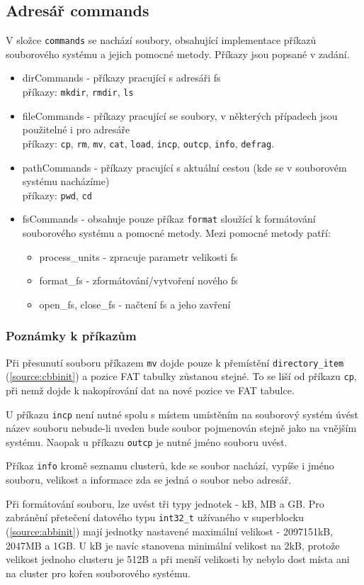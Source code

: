 \documentclass[12pt]{report}
\begin{document}
	\subsection*{Adresář commands}
	\par V složce \texttt{commands} se nachází soubory, obsahující implementace příkazů souborového systému a jejich pomocné metody. Příkazy jsou popsané v zadání.
	\begin{itemize}
		\item dirCommands - příkazy pracující s adresáři fs\\
		příkazy: \texttt{mkdir}, \texttt{rmdir}, \texttt{ls}
		\item fileCommands - příkazy pracující se soubory, v některých případech jsou použitelné i pro adresáře\\
		příkazy: \texttt{cp}, \texttt{rm}, \texttt{mv}, \texttt{cat}, \texttt{load}, \texttt{incp}, \texttt{outcp},
		\texttt{info}, \texttt{defrag}.
		\item pathCommands - příkazy pracující s aktuální cestou (kde se v souborovém systému nacházíme)\\
		příkazy: \texttt{pwd}, \texttt{cd}
		\item fsCommands - obsahuje pouze příkaz \texttt{format} sloužící k formátování souborového systému a pomocné metody. Mezi pomocné metody patří:
		\begin{itemize}
			\item process\_units - zpracuje parametr velikosti fs
			\item format\_fs - zformátování/vytvoření nového fs
			\item open\_fs, close\_fs - načtení fs a jeho zavření
		\end{itemize}
	\end{itemize}

	\subsubsection{Poznámky k příkazům}
	\par Při přesunutí souboru příkazem \texttt{mv} dojde pouze k přemístění \texttt{directory\_item} (\ref{source:cbbinit}) a pozice FAT tabulky zůstanou stejné. To se liší od příkazu \texttt{cp}, při nemž dojde k nakopírování dat na nové pozice ve FAT tabulce.
	\par U příkazu \texttt{incp} není nutné spolu s místem umístěním na souborový systém úvést název souboru nebude-li uveden bude soubor pojmenován stejně jako na vnějším systému. Naopak u příkazu \texttt{outcp} je nutné jméno souboru uvést.
	\par Příkaz \texttt{info} kromě seznamu clusterů, kde se soubor nachází, vypíše i jméno souboru, velikost a informace zda se jedná o soubor nebo adresář.
	\par Při formátování souboru, lze uvést tři typy jednotek - kB, MB a GB. Pro zabránění přetečení datového typu \texttt{int32\_t} užívaného v superblocku (\ref{source:abbinit}) mají jednotky nastavené maximální velikost - 2097151kB, 2047MB a 1GB. U kB je navíc stanovena minimální velikost na 2kB, protože velikost jednoho clusteru je 512B a při menší velikosti by nebylo dost místa ani na cluster pro kořen souborového systému.
\end{document}

